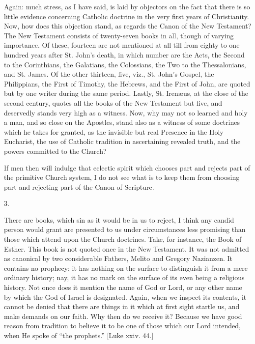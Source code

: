 Again: much stress, as I have said, is laid by objectors on the
fact that there is so little evidence concerning Catholic doctrine in
the very first years of Christianity. Now, how does this objection
stand, as regards the Canon of the New Testament? The New Testament
consists of twenty-seven books in all, though of varying importance.
Of these, fourteen are not mentioned at all till from eighty to one
hundred years after St. John's death, in which number are the Acts,
the Second to the Corinthians, the Galatians, the Colossians, the Two
to the Thessalonians, and St. James. Of the other thirteen,
five, viz., St. John's Gospel, the Philippians, the First of Timothy,
the Hebrews, and the First of John, are quoted but by one writer
during the same period. Lastly, St. Irenæus, at the close of the
second century, quotes all the books of the New Testament but five,
and deservedly stands very high as a witness. Now, why may not so
learned and holy a man, and so close on the Apostles, stand also as a
witness of some doctrines which he takes for granted, as the invisible
but real Presence in the Holy Eucharist, the use of Catholic tradition
in ascertaining revealed truth, and the powers committed to the
Church?

If men then will indulge that eclectic spirit which chooses part
and rejects part of the primitive Church system, I do not see what is
to keep them from choosing part and rejecting part of the Canon of
Scripture.

3.

There are books, which sin as it would be in us to reject, I think
any candid person would grant are presented to us under circumstances
less promising than those which attend upon the Church doctrines.
Take, for instance, the Book of Esther. This book is not quoted once
in the New Testament. It was not admitted as canonical by two
considerable Fathers, Melito and Gregory Nazianzen. It contains no
prophecy; it has nothing on the surface to distinguish it from a mere
ordinary history; nay, it has no mark on the surface of its even being
a religious history. Not once does it mention the name of God or Lord,
or any other name by which the God of Israel is designated. Again,
when we inspect its contents, it cannot be denied that there are
things in it which at first sight startle us, and make demands on our faith. Why then do we receive it? Because we have good reason
from tradition to believe it to be one of those which our Lord
intended, when He spoke of ``the prophets.'' [Luke xxiv. 44.]

